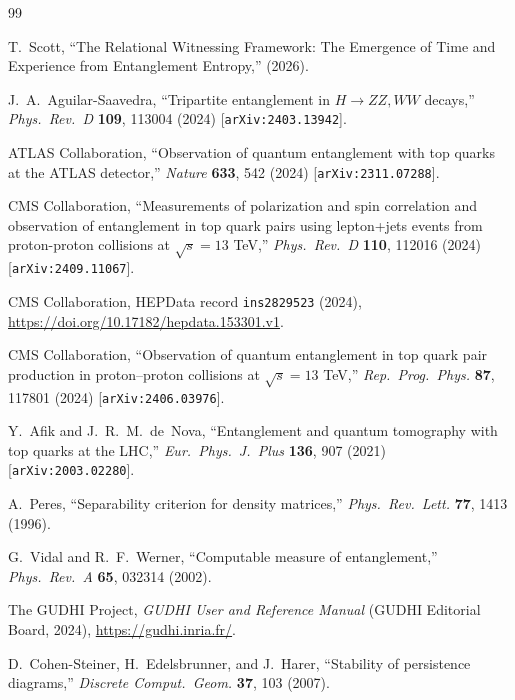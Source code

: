 \documentclass[11pt,a4paper]{article}
\theoremstyle{definition}
\begin{document}
\begin{thebibliography}{99}

T.~Scott, ``The Relational Witnessing Framework: The Emergence of Time and Experience from Entanglement Entropy,'' (2026).

J.~A.~Aguilar-Saavedra, ``Tripartite entanglement in $H \to ZZ, WW$ decays,'' \emph{Phys.~Rev.~D} \textbf{109}, 113004 (2024) [\texttt{arXiv:2403.13942}].

ATLAS Collaboration, ``Observation of quantum entanglement with top quarks at the ATLAS detector,'' \emph{Nature} \textbf{633}, 542 (2024) [\texttt{arXiv:2311.07288}].

CMS Collaboration, ``Measurements of polarization and spin correlation and observation of entanglement in top quark pairs using lepton+jets events from proton-proton collisions at $\sqrt{s} = 13$ TeV,'' \emph{Phys.~Rev.~D} \textbf{110}, 112016 (2024) [\texttt{arXiv:2409.11067}].

CMS Collaboration, HEPData record \texttt{ins2829523} (2024), \url{https://doi.org/10.17182/hepdata.153301.v1}.

CMS Collaboration, ``Observation of quantum entanglement in top quark pair production in proton--proton collisions at $\sqrt{s} = 13$ TeV,'' \emph{Rep.~Prog.~Phys.} \textbf{87}, 117801 (2024) [\texttt{arXiv:2406.03976}].

Y.~Afik and J.~R.~M.~de~Nova, ``Entanglement and quantum tomography with top quarks at the LHC,'' \emph{Eur.~Phys.~J.~Plus} \textbf{136}, 907 (2021) [\texttt{arXiv:2003.02280}].

A.~Peres, ``Separability criterion for density matrices,'' \emph{Phys.~Rev.~Lett.} \textbf{77}, 1413 (1996).

G.~Vidal and R.~F.~Werner, ``Computable measure of entanglement,'' \emph{Phys.~Rev.~A} \textbf{65}, 032314 (2002).

The GUDHI Project, \emph{GUDHI User and Reference Manual} (GUDHI Editorial Board, 2024), \url{https://gudhi.inria.fr/}.

D.~Cohen-Steiner, H.~Edelsbrunner, and J.~Harer, ``Stability of persistence diagrams,'' \emph{Discrete Comput.~Geom.} \textbf{37}, 103 (2007).

\end{thebibliography}
\end{document}
